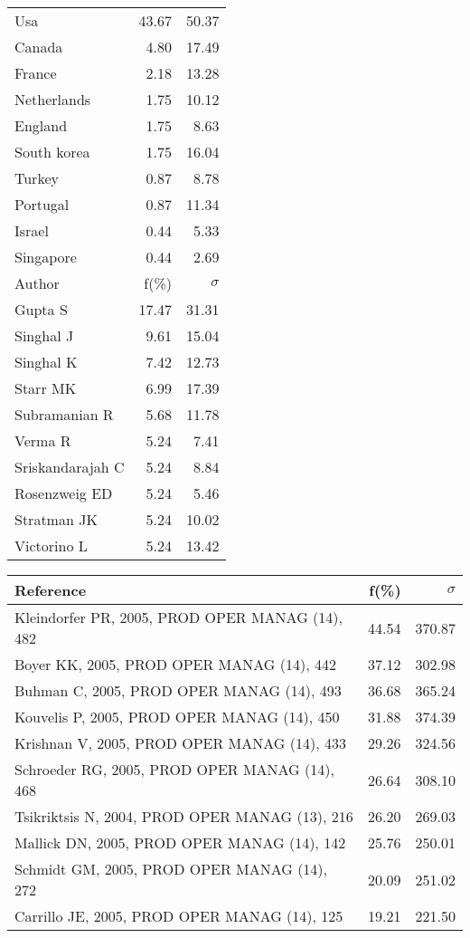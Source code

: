 \documentclass[a4paper,11pt]{report}
\begin{document}
\begin{landscape}
\begin{table}[!ht]
{\begin{tabular}{|l r r|}
\hline
Usa & 43.67 & 50.37\\
Canada & 4.80 & 17.49\\
France & 2.18 & 13.28\\
Netherlands & 1.75 & 10.12\\
England & 1.75 & 8.63\\
South korea & 1.75 & 16.04\\
Turkey & 0.87 & 8.78\\
Portugal & 0.87 & 11.34\\
Israel & 0.44 & 5.33\\
Singapore & 0.44 & 2.69\\
\hline
\hline
Author & f(\%) & $\sigma$\\
\hline
Gupta S & 17.47 & 31.31\\
Singhal J & 9.61 & 15.04\\
Singhal K & 7.42 & 12.73\\
Starr MK & 6.99 & 17.39\\
Subramanian R & 5.68 & 11.78\\
Verma R & 5.24 & 7.41\\
Sriskandarajah C & 5.24 & 8.84\\
Rosenzweig ED & 5.24 & 5.46\\
Stratman JK & 5.24 & 10.02\\
Victorino L & 5.24 & 13.42\\
\hline
\end{tabular}
}
{\scriptsize\begin{tabular}{|l r r|}
\hline
Reference & f(\%) & $\sigma$\\
\hline
Kleindorfer PR, 2005, PROD OPER MANAG (14), 482 & 44.54 & 370.87\\
Boyer KK, 2005, PROD OPER MANAG (14), 442 & 37.12 & 302.98\\
Buhman C, 2005, PROD OPER MANAG (14), 493 & 36.68 & 365.24\\
Kouvelis P, 2005, PROD OPER MANAG (14), 450 & 31.88 & 374.39\\
Krishnan V, 2005, PROD OPER MANAG (14), 433 & 29.26 & 324.56\\
Schroeder RG, 2005, PROD OPER MANAG (14), 468 & 26.64 & 308.10\\
Tsikriktsis N, 2004, PROD OPER MANAG (13), 216 & 26.20 & 269.03\\
Mallick DN, 2005, PROD OPER MANAG (14), 142 & 25.76 & 250.01\\
Schmidt GM, 2005, PROD OPER MANAG (14), 272 & 20.09 & 251.02\\
Carrillo JE, 2005, PROD OPER MANAG (14), 125 & 19.21 & 221.50\\

\end{tabular}}
\end{table}
\end{landscape}
\end{document}
